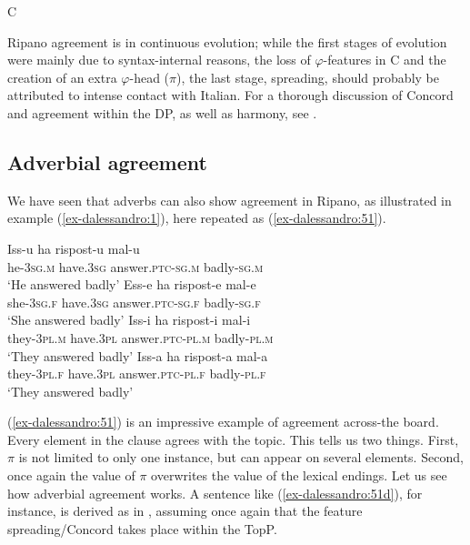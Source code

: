 \documentclass[output=paper
,modfonts
,nonflat]{langsci/langscibook}
\begin{document}
\begin{exe}
\ex C   
\end{exe}
Ripano agreement is in continuous evolution; while the first stages of evolution were mainly due to syntax-internal reasons, the loss of $\varphi $-features in C and the creation of an extra $\varphi $-head ($\pi $), the last stage, spreading, should probably be attributed to intense contact with Italian. For a thorough discussion of Concord and agreement within the DP, as well as harmony, see \citet{Paciaroni2017}. 

\subsection{Adverbial agreement} \label{sec-dalessandro:5.4}
We have seen that adverbs can also show agreement in Ripano, as illustrated in example (\ref{ex-dalessandro:1}), here repeated as (\ref{ex-dalessandro:51}).

\begin{exe}
	\ex \label{ex-dalessandro:51}\citet[8]{Burroni_Et_Al2016} \xlist
	\ex 
	\gll Iss-u    ha    rispost-u     mal-u\\
	he-3\textsc{sg.m}  have.\textsc{3sg}  answer.\textsc{ptc-sg.m}  badly-\textsc{sg.m}\\
	\glt `He answered badly' 
	\ex
	\gll Ess-e    ha    rispost-e     mal-e\\
	she-\textsc{3sg.f}  have.\textsc{3sg}  answer\textsc{.ptc-sg.f}  badly-\textsc{sg.f}\\
	\glt `She answered badly' 
	\ex
	\gll Iss-i    ha     rispost-i    mal-i\\
	they-\textsc{3pl.m} have.\textsc{3pl} answer.\textsc{ptc-pl.m}  badly-\textsc{pl.m}\\
	\glt `They answered badly' 
	\ex \label{ex-dalessandro:51d}
	\gll Iss-a    ha    rispost-a    mal-a\\
	they-\textsc{3pl.f} have.\textsc{3pl} answer.\textsc{ptc-pl.f}  badly-\textsc{pl.f}\\
	\glt `They answered badly' 
	\endxlist
\end{exe}
(\ref{ex-dalessandro:51}) is an impressive example of agreement across-the board. Every element in the clause agrees with the topic.
This tells us two things. First, $\pi $ is not limited to only one instance, but can appear on several elements. Second, once again the value of $\pi $ overwrites the value of the lexical endings.
Let us see how adverbial agreement works. A sentence like (\ref{ex-dalessandro:51d}), for instance, is derived as in , assuming once again that the feature spreading/Concord takes place within the TopP.\largerpage
\end{document}
